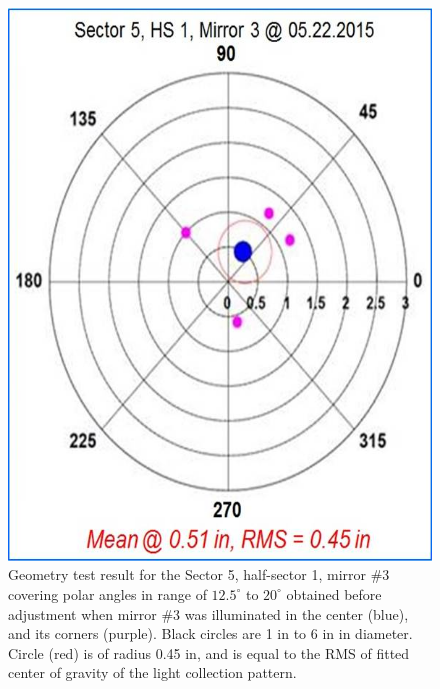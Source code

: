 \begin{figure}[ht]
    \centering
    \includegraphics[width=1.0\linewidth,trim={0 0cm 0 0},clip]{images/Ch_5_1_3_Before_NEW.jpg}
    \caption{Geometry test result for the Sector 5, half-sector 1, mirror \#3 covering polar angles in range of $12.5^\circ$ to $20^\circ$ obtained before adjustment when mirror \#3 was illuminated in the center (blue), and its corners (purple). Black circles are 1 in to 6 in in diameter. Circle (red) is of radius 0.45 in, and is equal to the RMS of fitted center of gravity  of the light collection pattern.}
    \label{fig:Ch_5_1_3_Before_NEW}
\end{figure}


